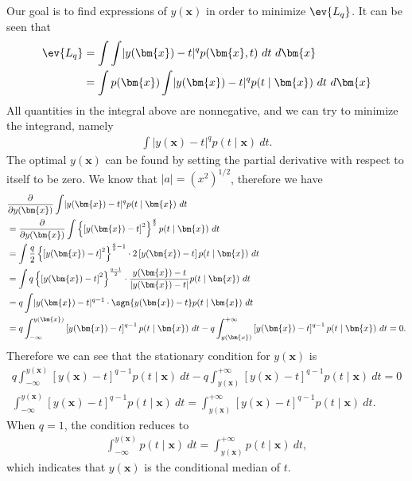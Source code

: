 \begin{answer}{}
	Our goal is to find expressions of $y(\bm{x})$ in order to minimize $\ev{L_q}$. It can be seen that
	\begin{align}
		\ev{L_q} &= \int\int \lvert y(\bm{x}) - t \rvert^q p(\bm{x}, t)\ dt\ d\bm{x}\\
		&= \int p(\bm{x}) \int \lvert y(\bm{x}) - t \rvert^q p(t \mid \bm{x}) \ dt\ d\bm{x}
	\end{align}
	All quantities in the integral above are nonnegative, and we can try to minimize the integrand, namely
	\begin{align}
		\int \lvert y(\bm{x}) - t \rvert^q p(t \mid \bm{x})\ dt.
	\end{align}
	The optimal $y(\bm{x})$ can be found by setting the partial derivative with respect to itself to be zero. We know that $\lvert a \rvert = \left(x^2 \right)^{1/2}$, therefore we have
	\begin{align}
		&\frac{\partial}{\partial y(\bm{x})}\int \lvert y(\bm{x}) - t \rvert^q p(t \mid \bm{x})\ dt\\
		&= \frac{\partial}{\partial y(\bm{x})}\int \left\{\left[ y(\bm{x}) - t \right]^2\right\}^{\frac{q}{2}} p(t \mid \bm{x})\ dt\\
		&= \int  \frac{q}{2} \left\{\left[ y(\bm{x}) - t \right]^2\right\}^{\frac{q}{2} - 1}\cdot 2\left[ y(\bm{x}) - t \right]p(t \mid \bm{x})\ dt\\
		&= \int q \left\{\left[ y(\bm{x}) - t \right]^2\right\}^{\frac{q-1}{2}} \cdot \frac{ y(\bm{x}) - t }{\left\lvert y(\bm{x}) - t\right\rvert}p(t \mid \bm{x})\ dt\\
		&= q \int \lvert y(\bm{x}) - t \rvert^{q-1} \cdot \sgn{y(\bm{x}) - t }p(t \mid \bm{x})\ dt\\
		&= q \int_{-\infty}^{y(\bm{x})} \left[ y(\bm{x}) - t \right]^{q-1} p(t \mid \bm{x})\ dt - q \int_{y(\bm{x})}^{+\infty} \left[ y(\bm{x}) - t \right]^{q-1}p(t \mid \bm{x})\ dt = 0.
	\end{align}
	Therefore we can see that the stationary condition for $y(\bm{x})$ is
	\begin{gather}
		q \int_{-\infty}^{y(\bm{x})} \left[ y(\bm{x}) - t \right]^{q-1} p(t \mid \bm{x})\ dt - q \int_{y(\bm{x})}^{+\infty} \left[ y(\bm{x}) - t \right]^{q-1}p(t \mid \bm{x})\ dt = 0\\
		 \int_{-\infty}^{y(\bm{x})} \left[ y(\bm{x}) - t \right]^{q-1} p(t \mid \bm{x})\ dt =  \int_{y(\bm{x})}^{+\infty} \left[ y(\bm{x}) - t \right]^{q-1}p(t \mid \bm{x})\ dt.
	\end{gather}
	When $q = 1$, the condition reduces to
	\begin{align}
		\int_{-\infty}^{y(\bm{x})} p(t \mid \bm{x})\ dt =  \int_{y(\bm{x})}^{+\infty}p(t \mid \bm{x})\ dt,
	\end{align}
	which indicates that $y(\bm{x})$ is the conditional median of $t$.
	
	
\end{answer}